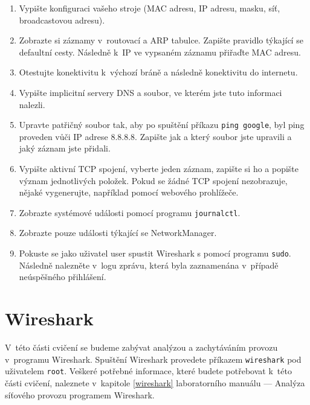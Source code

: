 \begin{enumerate}
\item Vypište konfiguraci vašeho stroje (MAC adresu, IP adresu, masku, síť, broadcastovou adresu).
\item Zobrazte si záznamy v~routovací a ARP tabulce. Zapište pravidlo týkající se defaultní cesty. Následně k~IP ve vypsaném záznamu přiřaďte MAC adresu.
\item Otestujte konektivitu k~výchozí bráně a následně konektivitu do internetu.
\item Vypište implicitní servery DNS a soubor, ve kterém jste tuto informaci nalezli.
\item Upravte patřičný soubor tak, aby po spuštění příkazu \texttt{ping google},
  byl ping proveden vůči IP adrese 8.8.8.8. Zapište jak a který soubor jste
    upravili a jaký záznam jste přidali.
\item Vypište aktivní TCP spojení, vyberte jeden záznam, zapište si ho a popište význam jednotlivých položek. Pokud se žádné TCP spojení nezobrazuje, nějaké vygenerujte, například pomocí webového prohlížeče.
\item Zobrazte systémové události pomocí programu \texttt{journalctl}.
\item Zobrazte pouze události týkající se NetworkManager.
\item Pokuste se jako uživatel user spustit Wireshark s pomocí programu \texttt{sudo}. Následně nalezněte v~logu zprávu, která byla zaznamenána v~případě neúspěšného přihlášení.
\end{enumerate}

\section{Wireshark}
V~této části cvičení se budeme zabývat analýzou a zachytáváním provozu
v~programu Wireshark. Spuštění Wireshark provedete příkazem \texttt{wireshark}
pod uživatelem \texttt{root}. Veškeré potřebné informace, které budete
potřebovat k~této části cvičení, naleznete v~kapitole \ref{wireshark} laboratorního manuálu
--- Analýza síťového provozu programem Wireshark.

